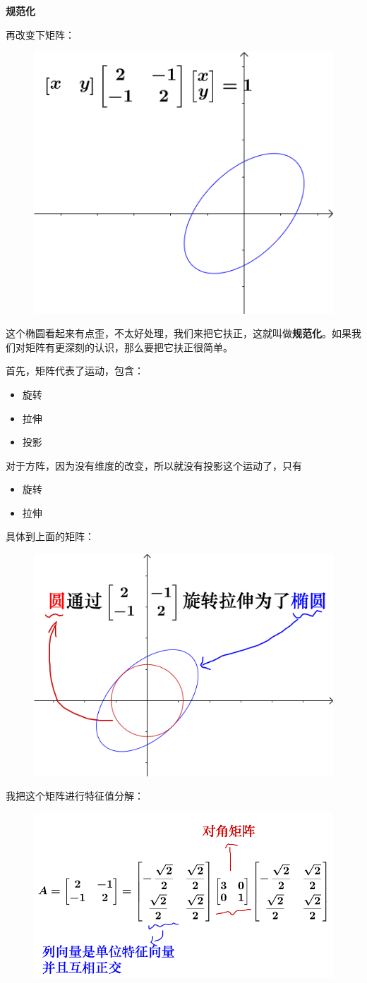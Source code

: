 \documentclass[12pt]{article}
\begin{document}
\textbf{规范化}

再改变下矩阵：
\begin{figure}[H]
    \centering
    \includegraphics[width=.5\textwidth]{fig/UnderstandQuadraticForm_6.png}
\end{figure} 

这个椭圆看起来有点歪，不太好处理，我们来把它扶正，这就叫做\textbf{规范化}。如果我们对矩阵有更深刻的认识，那么要把它扶正很简单。

首先，矩阵代表了运动，包含：
\begin{itemize}
    \item 旋转
    \item 拉伸
    \item 投影
\end{itemize}

对于方阵，因为没有维度的改变，所以就没有投影这个运动了，只有
\begin{itemize}
    \item 旋转
    \item 拉伸
\end{itemize}

具体到上面的矩阵：
\begin{figure}[H]
    \centering
    \includegraphics[width=.5\textwidth]{fig/UnderstandQuadraticForm_7.png}
\end{figure} 

我把这个矩阵进行特征值分解：
\begin{figure}[H]
    \centering
    \includegraphics[width=.8\textwidth]{fig/UnderstandQuadraticForm_8.png}
\end{figure} 
\end{document}
